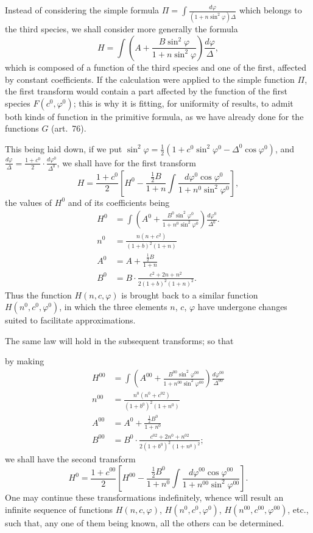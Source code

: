 \documentclass{article}
\begin{document}
 Instead of considering the simple formula $\Pi=\displaystyle\int\frac{d\varphi}{(1+n\sin^{2}\varphi)\Delta}$ which belongs to the third species, we shall consider more generally the formula
\[ H=\int\left(A+\frac{B\sin^{2}\varphi}{1+n\sin^{2}\varphi}\right)\frac{d\varphi}{\Delta}, \]
which is composed of a function of the third species and one of the first, affected by constant coefficients. If the calculation were applied to the simple function $\Pi$, the first transform would contain a part affected by the function of the first species $F(c^{0},\varphi^{0})$; this is why it is fitting, for uniformity of results, to admit both kinds of function in the primitive formula, as we have already done for the functions $G$ (art.\ 76).

This being laid down, if we put $\sin^{2}\varphi=\frac{1}{2}(1+c^{0}\sin^{2}\varphi^{0}-\Delta^{0}\cos\varphi^{0})$, and $\frac{d\varphi}{\Delta}=\frac{1+c^{0}}{2}\cdot\frac{d\varphi^{0}}{\Delta^{0}}$, we shall have for the first transform
\[ H=\frac{1+c^{0}}{2}\left[H^{0}-\frac{\tfrac{1}{2}B}{1+n}\int\frac{d\varphi^{0}\cos\varphi^{0}}{1+n^{0}\sin^{2}\varphi^{0}}\right], \]
the values of $H^{0}$ and of its coefficients being
\[ \begin{aligned} H^{0}&=\int\left(A^{0}+\frac{B^{0}\sin^{2}\varphi^{0}}{1+n^{0}\sin^{2}\varphi^{0}}\right)\frac{d\varphi^{0}}{\Delta^{0}}.\\ n^{0}&=\frac{n(n+c^{2})}{(1+b)^{2}(1+n)}\\ A^{0}&=A+\frac{\tfrac{1}{2}B}{1+n}\\ B^{0}&=B\cdot\frac{c^{2}+2n+n^{2}}{2(1+b)^{2}(1+n)^{2}}. \end{aligned} \]
Thus the function $H(n,c,\varphi)$ is brought back to a similar function $H(n^{0},c^{0},\varphi^{0})$, in which the three elements $n$, $c$, $\varphi$ have undergone changes suited to facilitate approximations.

The same law will hold in the subsequent transforms; so that

by making
\[ \begin{aligned} H^{00}&=\int\left(A^{00}+\frac{B^{00}\sin^{2}\varphi^{00}}{1+n^{00}\sin^{2}\varphi^{00}}\right)\frac{d\varphi^{00}}{\Delta^{00}}\\ n^{00}&=\frac{n^{0}(n^{0}+c^{02})}{(1+b^{0})^{2}(1+n^{0})}\\ A^{00}&=A^{0}+\frac{\tfrac{1}{2}B^{0}}{1+n^{0}}\\ B^{00}&=B^{0}\cdot\frac{c^{02}+2n^{0}+n^{02}}{2(1+b^{0})^{2}(1+n^{0})^{2}}; \end{aligned} \]
we shall have the second transform
\[ H^{0}=\frac{1+c^{00}}{2}\left[H^{00}-\frac{\tfrac{1}{2}B^{0}}{1+n^{0}}\int\frac{d\varphi^{00}\cos\varphi^{00}}{1+n^{00}\sin^{2}\varphi^{00}}\right]. \]
One may continue these transformations indefinitely, whence will result an infinite sequence of functions $H(n,c,\varphi)$, $H(n^{0},c^{0},\varphi^{0})$, $H(n^{00},c^{00},\varphi^{00})$, etc., such that, any one of them being known, all the others can be determined.
\end{document}
